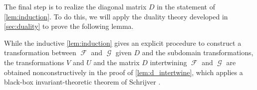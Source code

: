 \documentclass{article}
\makeatletter
\DeclareMathOperator{\rr}{\mathbb{R}}
\DeclareMathOperator{\fc}{\mathcal{F}}
\DeclareMathOperator{\gc}{\mathcal{G}}
\newcommand\IfRestateTF{%
  \ifx\label\thmt@gobble@label %
    \expandafter\@firstoftwo
  \else
    \expandafter\@secondoftwo
  \fi
}
\newcommand{\RestateRemark}{\IfRestateTF{{\normalfont\bfseries (Restated) }}{}}
\makeatother
\begin{document}
The final step is to realize the diagonal matrix $D$ in the statement of 
\autoref{lem:induction}. To do this, we will apply the duality theory developed in
\autoref{sec:duality} to prove the following lemma.

While the inductive \autoref{lem:induction} gives an explicit procedure to construct a 
transformation between $\fc$ and $\gc$ given $D$ and the subdomain transformations,
the transformations $V$ and $U$ and the matrix $D$ 
intertwining $\fc$ and $\gc$ are obtained nonconstructively in the proof of
\autoref{lem:d_intertwine}, which applies a black-box invariant-theoretic theorem of 
Schrijver \cite{schrijver_tensor_2008}.
\end{document}
